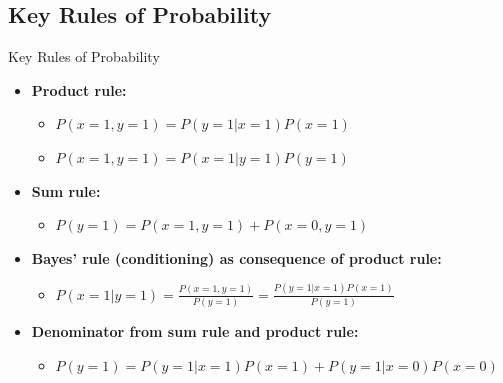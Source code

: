 \documentclass{beamer}
\begin{document}
\subsection{Key Rules of Probability}

\begin{frame}{Key Rules of Probability}
\begin{itemize}
\item \textbf{Product rule:}
  \begin{itemize}
    \item $P(x = 1, y = 1) = P(y = 1|x = 1)P(x = 1)$
    \item $P(x = 1, y = 1) = P(x = 1|y = 1)P(y = 1)$
  \end{itemize}
\item \textbf{Sum rule:}
  \begin{itemize}
  \item $P(y = 1) = P(x = 1, y = 1) + P(x = 0, y = 1)$
  \end{itemize}
\item \textbf{Bayes' rule (conditioning) as consequence of product rule:}
  \begin{itemize}
    \item $P(x = 1|y = 1) = \frac{P(x = 1, y = 1)}{P(y = 1)} = \frac{P(y = 1|x = 1)P(x = 1)}{P(y = 1)}$
  \end{itemize}
\item \textbf{Denominator from sum rule and product rule:}
  \begin{itemize}
    \item $P(y = 1) = P(y = 1|x = 1)P(x = 1) + P(y = 1|x = 0)P(x = 0)$
    \end{itemize}
\end{itemize}
\end{frame}
\end{document}
